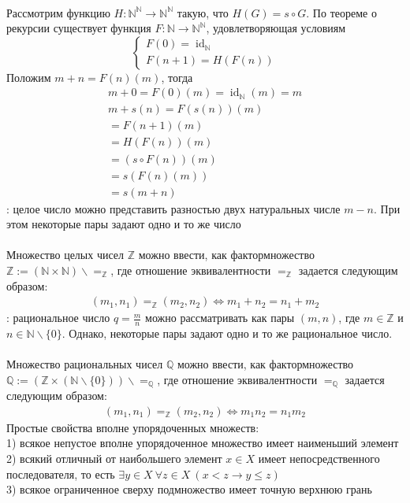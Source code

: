 \\
Рассмотрим функцию $H: \mathbb{N}^\mathbb{N} \to \mathbb{N}^\mathbb{N}$ такую, что $H(G) = s \circ G$. По теореме о рекурсии существует функция $F: \mathbb{N} \to \mathbb{N}^\mathbb{N}$, удовлетворяющая условиям
$$
\begin{cases}
	F(0) = \operatorname{id}_\mathbb{N}\\
	F(n+1) = H(F(n))
\end{cases}
$$
Положим $m+n = F(n)(m)$, тогда
\begin{gather*}
m+0 = F(0)(m) = \operatorname{id}_\mathbb{N}(m) = m\\
m+s(n) = F(s(n))(m)\\
=F(n+1)(m)\\
=H(F(n))(m)\\
=(s \circ F(n))(m)\\
=s(F(n)(m))\\
= s(m+n)
\end{gather*}
: целое число можно представить разностью двух натуральных числе $m-n$. При этом некоторые пары задают одно и то же число\\
\\
Множество целых чисел $\mathbb{Z}$ можно ввести, как фактормножество $\mathbb{Z} := (\mathbb{N} \times \mathbb{N})\backslash =_{\mathbb{Z}}$, где отношение эквивалентности $=_{\mathbb{Z}}$ задается следующим образом:
\begin{gather*}
	(m_1,n_1) =_{\mathbb{Z}} (m_2, n_2) \Leftrightarrow m_1 + n_2 = n_1 + m_2
\end{gather*}
: рациональное число $q= \frac{m}{n}$ можно рассматривать как пары $(m,n)$, где $m \in \mathbb{Z}$ и $n \in \mathbb{N} \backslash \{0\}$. Однако, некоторые пары задают одно и то же рациональное число.\\
\\
Множество рациональных чисел $\mathbb{Q}$ можно ввести, как фактормножество $\mathbb{Q} := (\mathbb{Z} \times (\mathbb{N} \backslash \{0\}))\backslash =_{\mathbb{Q}}$, где отношение эквивалентности $=_{\mathbb{Q}}$ задается следующим образом:
\begin{gather*}
	(m_1, n_1) =_{\mathbb{Z}} (m_2, n_2) \Leftrightarrow m_1n_2 = n_1m_2
\end{gather*}
Простые свойства вполне упорядоченных множеств:\\
1) всякое непустое вполне упорядоченное множество имеет наименьший элемент\\
2) всякий отличный от наибольшего элемент $x \in X$ имеет непосредственного последователя, то есть $\exists y \in X\ \forall z \in X\ (x < z \to y \leqslant z)$\\
3) всякое ограниченное сверху подмножество имеет точную верхнюю грань
\vskip 0.2in

